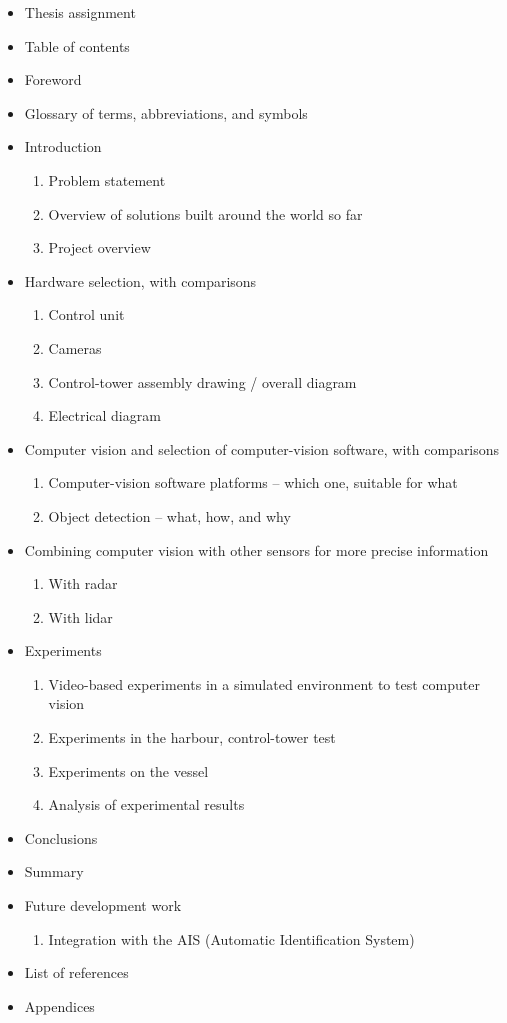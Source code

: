 \begin{itemize}
  \item Thesis assignment
  \item Table of contents
  \item Foreword
  \item Glossary of terms, abbreviations, and symbols
  \item Introduction
    \begin{enumerate}
      \item Problem statement
      \item Overview of solutions built around the world so far
      \item Project overview
    \end{enumerate}
  \item Hardware selection, with comparisons
    \begin{enumerate}
      \item Control unit
      \item Cameras
      \item Control-tower assembly drawing / overall diagram
      \item Electrical diagram
    \end{enumerate}
  \item Computer vision and selection of computer-vision software, with comparisons
    \begin{enumerate}
      \item Computer-vision software platforms -- which one, suitable for what
      \item Object detection -- what, how, and why
    \end{enumerate}
  \item Combining computer vision with other sensors for more precise information
    \begin{enumerate}
      \item With radar
      \item With lidar
    \end{enumerate}
  \item Experiments
    \begin{enumerate}
      \item Video-based experiments in a simulated environment to test computer vision
      \item Experiments in the harbour, control-tower test
      \item Experiments on the vessel
      \item Analysis of experimental results
    \end{enumerate}
  \item Conclusions
  \item Summary
  \item Future development work
    \begin{enumerate}
      \item Integration with the AIS (Automatic Identification System)
    \end{enumerate}
  \item List of references
  \item Appendices
\end{itemize}

